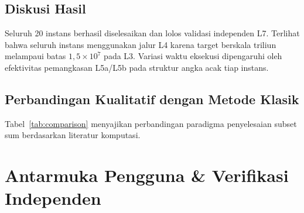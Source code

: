\documentclass[journal,onecolumn,11pt]{IEEEtran}
\begin{document}
\subsection{Diskusi Hasil}
Seluruh 20 instans berhasil diselesaikan dan lolos validasi independen L7. Terlihat bahwa seluruh instans menggunakan jalur L4 karena target berskala triliun melampaui batas $1{,}5\times10^7$ pada L3. Variasi waktu eksekusi dipengaruhi oleh efektivitas pemangkasan L5a/L5b pada struktur angka acak tiap instans.

\subsection{Perbandingan Kualitatif dengan Metode Klasik}
Tabel~\ref{tab:comparison} menyajikan perbandingan paradigma penyelesaian subset sum berdasarkan literatur komputasi.

\begin{table}[t]
\centering
\caption{Perbandingan Kualitatif Paradigma Penyelesaian Subset Sum}
\label{tab:comparison}
\renewcommand{\arraystretch}{1.3}
\footnotesize
{}
\end{table}

\section{Antarmuka Pengguna \& Verifikasi Independen}
\label{sec:ui_verification}
\end{document}
